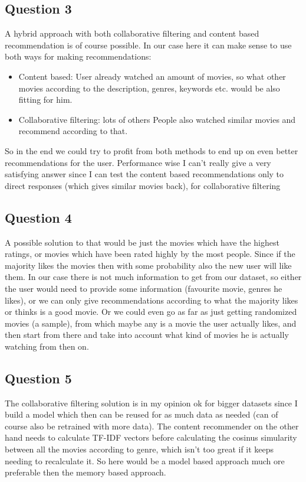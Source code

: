 \documentclass[11pt,a4paper]{article}
\begin{document}
\subsection{Question 3}
A hybrid approach with both collaborative filtering and content based recommendation is of course possible.
In our case here it can make sense to use both ways for making recommendations:
\begin{itemize}
	\item Content based: User already watched an amount of movies, so what other movies according to the description, genres, keywords etc. would be also fitting for him.
	\item Collaborative filtering: lots of others People also watched similar movies and recommend according to that.
\end{itemize}
So in the end we could try to profit from both methods to end up on even better recommendations for the user.
Performance wise I can't really give a very satisfying answer since I can test the content based recommendations only to direct responses (which gives similar movies back), for collaborative filtering

\subsection{Question 4}
A possible solution to that would be just the movies which have the highest ratings, or movies which have been rated highly by the most people.
Since if the majority likes the movies then with some probability also the new user will like them.
In our case there is not much information to get from our dataset, so either the user would need to provide some information (favourite movie, genres he likes), or we can only give recommendations according to what the majority likes or thinks is a good movie.
Or we could even go as far as just getting randomized movies (a sample), from which maybe any is a movie the user actually likes, and then start from there and take into account what kind of movies he is actually watching from then on.

\subsection{Question 5}

The collaborative filtering solution is in my opinion ok for bigger datasets since I build a model which then can be reused for as much data as needed (can of course also be retrained with more data).
The content recommender on the other hand needs to calculate TF-IDF vectors before calculating the cosinus simularity between all the movies according to genre, which isn't too great if it keeps needing to recalculate it.
So here would be a model based approach much ore preferable then the memory based approach.
\end{document}
